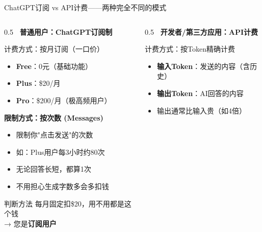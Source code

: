 \documentclass[aspectratio=169,11pt]{beamer}
\begin{document}
\begin{frame}{ChatGPT订阅 vs API计费——两种完全不同的模式}
    \begin{columns}
        \begin{column}{0.5\textwidth}
            \textbf{\textcolor{openaigreen}{\faUser\ 普通用户：ChatGPT订阅制}}
            \begin{block}{计费方式：按月订阅（一口价）}
                \begin{itemize}
                    \item \textbf{Free}：0元（基础功能）
                    \item \textbf{Plus}：\$20/月
                    \item \textbf{Pro}：\$200/月（极高频用户）
                \end{itemize}
            \end{block}
            
            \textbf{限制方式：按次数 (Messages)}
            \begin{itemize}
                \item 限制你"点击发送"的次数
                \item 如：Plus用户每3小时约80次
                \item \textcolor{green!60!black}{无论回答长短，都算1次}
                \item 不用担心生成字数多会多扣钱
            \end{itemize}
            
            \vspace{0.2cm}
            \begin{exampleblock}{判断方法}
                \small
                每月固定扣\$20，用不用都是这个钱\\
                → 您是\textbf{订阅用户}
            \end{exampleblock}
        \end{column}
        \begin{column}{0.5\textwidth}
            \textbf{\textcolor{githubblack}{\faCode\ 开发者/第三方应用：API计费}}
            \begin{block}{计费方式：按Token精确计费}
                \begin{itemize}
                    \item \textbf{输入Token}：发送的内容（含历史）
                    \item \textbf{输出Token}：AI回答的内容
                    \item 输出通常比输入贵（如4倍）
                \end{itemize}
            \end{block}
            

\end{column}
\end{columns}
\end{frame}
\end{document}
